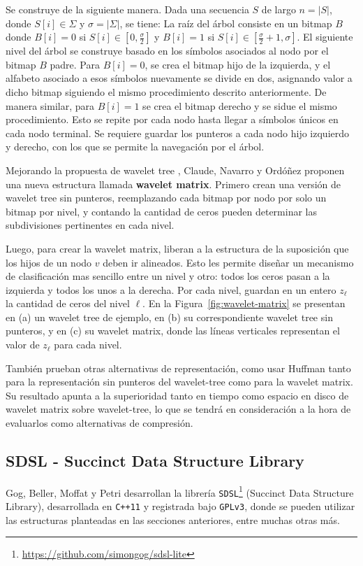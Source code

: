 Se construye de la siguiente manera. Dada una secuencia $S$ de largo $n = |S|$, donde $S[i] \in \Sigma$ y $\sigma = |\Sigma|$, se tiene: La raíz del árbol consiste en un bitmap $B$ donde $B[i] = 0$ si $S[i] \in [0, \frac{\sigma}{2}]$ y $B[i] = 1$ si $S[i] \in [\frac{\sigma}{2} + 1, \sigma]$. El siguiente nivel del árbol se construye basado en los símbolos asociados al nodo por el bitmap $B$ padre. Para $B[i] = 0$, se crea el bitmap hijo de la izquierda, y el alfabeto asociado a esos símbolos nuevamente se divide en dos, asignando valor a dicho bitmap siguiendo el mismo procedimiento descrito anteriormente. De manera similar, para $B[i] = 1$ se crea el bitmap derecho y se sidue el mismo procedimiento. Esto se repite por cada nodo hasta llegar a símbolos únicos en cada nodo terminal. Se requiere guardar los punteros a cada nodo hijo izquierdo y derecho, con los que se permite la navegación por el árbol.

Mejorando la propuesta de wavelet tree \cite{grossi2003high}, Claude, Navarro y Ordóñez \cite{claude2015wavelet} proponen una nueva estructura llamada \textbf{wavelet matrix}. Primero crean una versión de wavelet tree sin punteros, reemplazando cada bitmap por nodo por solo un bitmap por nivel, y contando la cantidad de ceros pueden determinar las subdivisiones pertinentes en cada nivel. 

Luego, para crear la wavelet matrix, liberan a la estructura de la suposición que los hijos de un nodo $v$ deben ir alineados. Esto les permite diseñar un mecanismo de clasificación mas sencillo entre un nivel y otro: todos los ceros pasan a la izquierda y todos los unos a la derecha. Por cada nivel, guardan en un entero $z_{\ell}$ la cantidad de ceros del nivel $\ell$. En la Figura~\ref{fig:wavelet-matrix} se presentan en (a) un wavelet tree de ejemplo, en (b) su correspondiente wavelet tree sin punteros, y en (c) su wavelet matrix, donde las líneas verticales representan el valor de $z_{\ell}$ para cada nivel.



También prueban otras alternativas de representación, como usar Huffman \cite{huffman1952method} tanto para la representación sin punteros del wavelet-tree como para la wavelet matrix. Su resultado apunta a la superioridad tanto en tiempo como espacio en disco de wavelet matrix sobre wavelet-tree, lo que se tendrá en consideración a la hora de evaluarlos como alternativas de compresión.

\subsection{SDSL - Succinct Data Structure Library}
Gog, Beller, Moffat y Petri \cite{gbmp2014sea} desarrollan la librería \texttt{SDSL}\footnote{\url{https://github.com/simongog/sdsl-lite}} (Succinct Data Structure Library), desarrollada en \texttt{C++11} y registrada bajo \texttt{GPLv3}, donde se pueden utilizar las estructuras planteadas en las secciones anteriores, entre muchas otras más.



